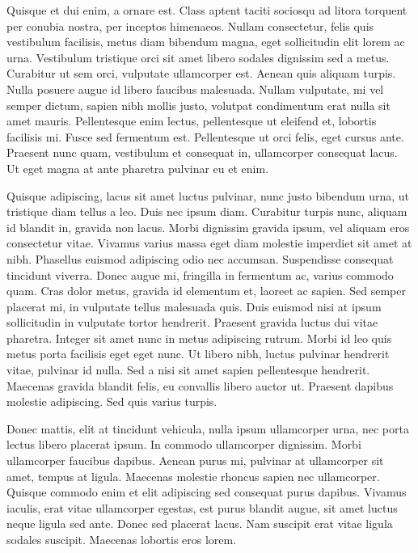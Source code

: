 Quisque et dui enim, a ornare est.
Class aptent taciti sociosqu ad litora torquent per conubia nostra, per inceptos himenaeos.
Nullam consectetur, felis quis vestibulum facilisis, metus diam bibendum magna, eget sollicitudin elit lorem ac urna.
Vestibulum tristique orci sit amet libero sodales dignissim sed a metus.
Curabitur ut sem orci, vulputate ullamcorper est.
Aenean quis aliquam turpis.
Nulla posuere augue id libero faucibus malesuada.
Nullam vulputate, mi vel semper dictum, sapien nibh mollis justo, volutpat condimentum erat nulla sit amet mauris.
Pellentesque enim lectus, pellentesque ut eleifend et, lobortis facilisis mi.
Fusce sed fermentum est.
Pellentesque ut orci felis, eget cursus ante.
Praesent nunc quam, vestibulum et consequat in, ullamcorper consequat lacus.
Ut eget magna at ante pharetra pulvinar eu et enim.

Quisque adipiscing, lacus sit amet luctus pulvinar, nunc justo bibendum urna, ut tristique diam tellus a leo.
Duis nec ipsum diam.
Curabitur turpis nunc, aliquam id blandit in, gravida non lacus.
Morbi dignissim gravida ipsum, vel aliquam eros consectetur vitae.
Vivamus varius massa eget diam molestie imperdiet sit amet at nibh.
Phasellus euismod adipiscing odio nec accumsan.
Suspendisse consequat tincidunt viverra.
Donec augue mi, fringilla in fermentum ac, varius commodo quam.
Cras dolor metus, gravida id elementum et, laoreet ac sapien.
Sed semper placerat mi, in vulputate tellus malesuada quis.
Duis euismod nisi at ipsum sollicitudin in vulputate tortor hendrerit.
Praesent gravida luctus dui vitae pharetra.
Integer sit amet nunc in metus adipiscing rutrum.
Morbi id leo quis metus porta facilisis eget eget nunc.
Ut libero nibh, luctus pulvinar hendrerit vitae, pulvinar id nulla.
Sed a nisi sit amet sapien pellentesque hendrerit.
Maecenas gravida blandit felis, eu convallis libero auctor ut.
Praesent dapibus molestie adipiscing.
Sed quis varius turpis.

Donec mattis, elit at tincidunt vehicula, nulla ipsum ullamcorper urna, nec porta lectus libero placerat ipsum.
In commodo ullamcorper dignissim.
Morbi ullamcorper faucibus dapibus.
Aenean purus mi, pulvinar at ullamcorper sit amet, tempus at ligula.
Maecenas molestie rhoncus sapien nec ullamcorper.
Quisque commodo enim et elit adipiscing sed consequat purus dapibus.
Vivamus iaculis, erat vitae ullamcorper egestas, est purus blandit augue, sit amet luctus neque ligula sed ante.
Donec sed placerat lacus.
Nam suscipit erat vitae ligula sodales suscipit.
Maecenas lobortis eros lorem.

